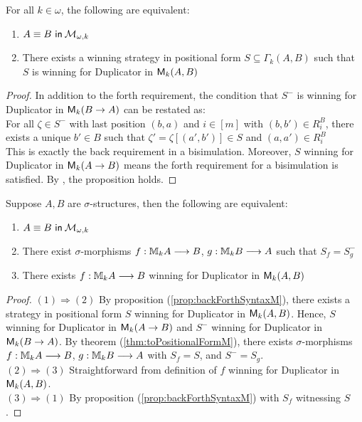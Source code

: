 \begin{prop}
For all $k \in \omega$, the following are equivalent:
\begin{enumerate}[label=(\arabic*)$_{k}$]
\item ${A \equiv B \ \mathsf{in}\: \mathcal{M}_{\omega,k}}$ 
\item There exists a winning strategy in positional form $S \subseteq \Gamma_{k}(A,B)$ such that $S$ is winning for Duplicator in ${\mathsf{M}_{k}(A,B)}$ 
\end{enumerate}
\begin{proof}
In addition to the forth requirement, the condition that $S^{-}$ is winning for Duplicator in ${\mathsf{M}_{k}(B \rightarrow A)}$ can be restated as:\\
For all $\zeta \in S^{-}$ with last position $(b,a)$ and $i \in [m]$ with $(b,b') \in R_{i}^{B}$, there exists a unique $b' \in B$ such that $\zeta' = \zeta[(a',b')] \in S$ and $(a,a') \in R_{i}^{B}$ \\
This is exactly the back requirement in a bisimulation. Moreover, $S$ winning for Duplicator in ${\mathsf{M}_{k}(A \rightarrow B)}$ means the forth requirement for a bisimulation is satisfied. By \cite[]{Gradel2014}, the proposition holds.
\end{proof}
\begin{cor}
Suppose $A,B$ are $\sigma$-structures, then the following are equivalent:
\begin{enumerate}[label=(\arabic*)]
\item ${A \equiv B \ \mathsf{in}\: \mathcal{M}_{\omega,k}}$ 
\item There exist $\sigma$-morphisms $f:{\mathbb{M}_{k}A} \longrightarrow B$, $g:{\mathbb{M}_{k}B} \longrightarrow A$ such that $S_{f} = S_{g}^{-}$ 
\item There exists $f:{\mathbb{M}_{k}A} \longrightarrow B$ winning for Duplicator in ${\mathsf{M}_{k}(A,B)}$ 
\end{enumerate}
\begin{proof}
$(1) \Rightarrow (2)$ By proposition (\ref{prop:backForthSyntaxM}), there exists a strategy in positional form $S$ winning for Duplicator in ${\mathsf{M}_{k}(A,B)}$. Hence, $S$ winning for Duplicator in ${\mathsf{M}_{k}(A \rightarrow B)}$ and $S^{-}$ winning for Duplicator in ${\mathsf{M}_{k}(B \rightarrow A)}$. By theorem (\ref{thm:toPositionalFormM}), there exists $\sigma$-morphisms $f:{\mathbb{M}_{k}A} \longrightarrow B$, $g:{\mathbb{M}_{k}B} \longrightarrow A$ with $S_{f} = S$, and $S^{-} = S_{g}$. \\ 
$(2) \Rightarrow (3)$ Straightforward from definition of $f$ winning for Duplicator in ${\mathsf{M}_{k}(A,B)}$. \\ 
$(3) \Rightarrow (1)$ By proposition (\ref{prop:backForthSyntaxM}) with $S_{f}$ witnessing $S$.  
\end{proof}
\label{cor:backForthM}
\end{cor}
\label{prop:backForthSyntaxM}
\end{prop}
